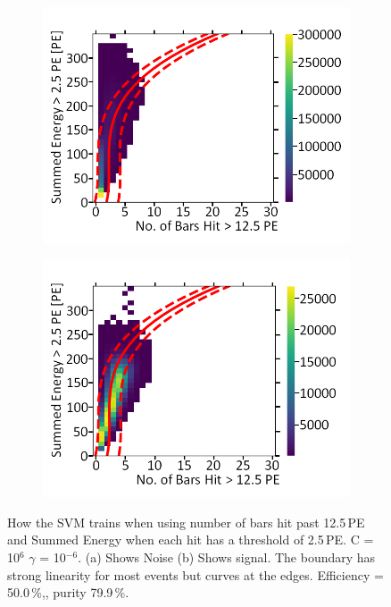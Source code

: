 \begin{figure}[!h]
\centering
\begin{subfigure}{.5\textwidth}
  \centering
  \includegraphics[width=\linewidth]{Appendix1/Figs/Bars2Sum1Noise.png}
  \captionsetup{width=.9\linewidth}
  \caption{}
  \label{subFig:Bars2Sum1Noise}
\end{subfigure}%
\begin{subfigure}{.5\textwidth}
  \centering
\includegraphics[width=\linewidth]{Appendix1/Figs/Bars2Sum1Signal.png}
  \captionsetup{width=.9\linewidth}
  \caption{}
  \label{subFig:Bars2Sum1Signal}
\end{subfigure}
\caption{How the SVM trains when using number of bars hit past 12.5\,PE and Summed Energy when each hit has a threshold of 2.5\,PE. C = 10$^6$ $\gamma$ = 10$^{-6}$. (a) Shows Noise (b) Shows signal. The boundary has strong linearity for most events but curves at the edges. Efficiency = 50.0\,\%,, purity 79.9\,\%.}
\label{fig:Bars2Sum1SignalNoise}
\end{figure}

